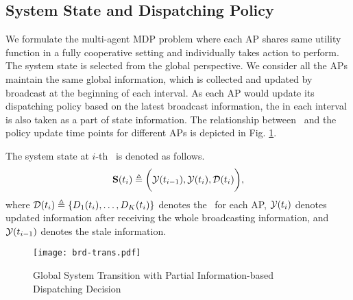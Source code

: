 \subsection{System State and Dispatching Policy}
We formulate the multi-agent MDP problem where each AP shares same utility function in a fully cooperative setting and individually takes action to perform.
The system state is selected from the global perspective.
We consider all the APs maintain the same global information, which is collected and updated by broadcast at the beginning of each interval.
As each AP would update its dispatching policy based on the latest broadcast information, the  in each interval is also taken as a part of state information.
The relationship between \brdelay~and the policy update time points for different APs is depicted in Fig. \ref{fig:brd-trans}.
\begin{definition}
    The system state at $i$-th \brpoint~is denoted as follows.
    \begin{align}
        \mathbf{S}(t_i) \triangleq \bigg(
            \mathcal{Y}(t_{i-1}), \mathcal{Y}({t_{i}}), \mathcal{D}(t_{i})
        \bigg),
    \end{align}
    where $\mathcal{D}(t_{i}) \triangleq \{D_{1}(t_{i}), \dots, D_{K}(t_{i})\}$ denotes the \brdelay~for each AP, $\mathcal{Y}(t_{i})$ denotes updated information after receiving the whole broadcasting information, and $\mathcal{Y}(t_{i-1})$ denotes the stale information.
\end{definition}

\begin{figure}[ht]
    \centering
    \texttt{[image: brd-trans.pdf]}
    \caption{Global System Transition with Partial Information-based Dispatching Decision}
    \label{fig:brd-trans}
\end{figure}

